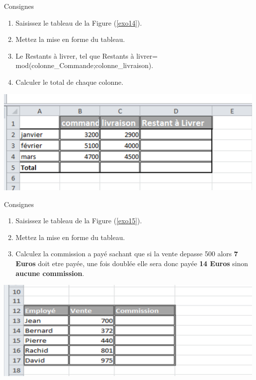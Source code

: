 \begin{exercice} 
	Consignes 
	\begin{enumerate}		
		\item  Saisissez le tableau  de la Figure (\ref{exo14}).  				
		\item  Mettez la mise en forme  du tableau.
		\item  Le Restants à livrer, tel que Restants à livrer= mod(colonne\_Commande;colonne\_livraison).
		\item  Calculer le total de chaque colonne.
	\end{enumerate}	
\end{exercice}
\begin{center}  
	\includegraphics[scale=0.2,width= \linewidth]{img/ex014} 
	\label{exo14}
\end{center}

\begin{exercice} 
	Consignes 
	\begin{enumerate}		
		\item  Saisissez le tableau  de la Figure (\ref{exo15}).  				
		\item  Mettez la mise en forme  du tableau.
		\item Calculez la commission a payé sachant que si la vente depasse 500 alors \textbf{7 Euros} doit etre payée, une fois doublée elle sera donc payée \textbf{14 Euros} sinon \textbf{aucune commission}.
	\end{enumerate}	
\end{exercice}
\begin{center}  
	\includegraphics[scale=0.2,width= \linewidth]{img/ex015} 
	\label{exo15}
\end{center}

